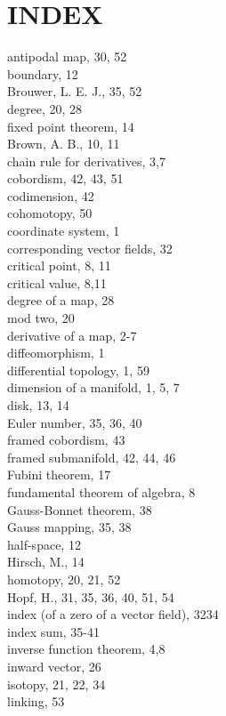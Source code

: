 \documentclass[10pt, letterpaper]{article}
\begin{document}
\section*{INDEX}
antipodal map, 30, 52\\
boundary, 12\\
Brouwer, L. E. J., 35, 52\\
degree, 20, 28\\
fixed point theorem, 14\\
Brown, A. B., 10, 11\\
chain rule for derivatives, 3,7\\
cobordism, 42, 43, 51\\
codimension, 42\\
cohomotopy, 50\\
coordinate system, 1\\
corresponding vector fields, 32\\
critical point, 8, 11\\
critical value, 8,11\\
degree of a map, 28\\
mod two, 20\\
derivative of a map, 2-7\\
diffeomorphism, 1\\
differential topology, 1, 59\\
dimension of a manifold, 1, 5, 7\\
disk, 13, 14\\
Euler number, 35, 36, 40\\
framed cobordism, 43\\
framed submanifold, 42, 44, 46\\
Fubini theorem, 17\\
fundamental theorem of algebra, 8\\
Gauss-Bonnet theorem, 38\\
Gauss mapping, 35, 38\\
half-space, 12\\
Hirsch, M., 14\\
homotopy, 20, 21, 52\\
Hopf, H., 31, 35, 36, 40, 51, 54\\
index (of a zero of a vector field), 3234\\
index sum, 35-41\\
inverse function theorem, 4,8\\
inward vector, 26\\
isotopy, 21, 22, 34\\
linking, 53\\
\end{document}
